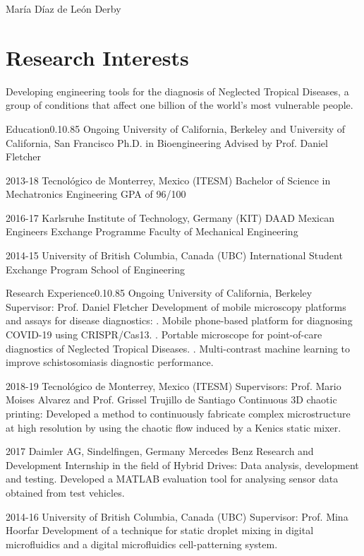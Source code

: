 \documentclass{federico_cv}
\begin{document}
\contact
{María Díaz de León Derby}
{} %
{} %



\section{Research Interests}
Developing engineering tools for the diagnosis of Neglected Tropical Diseases, a group of conditions that affect one billion of the world's most vulnerable people.


\begin{tblSection}{Education}{0.1}{0.85}
\degree
{Ongoing}
{University of California, Berkeley and University of California, San Francisco}
{Ph.D. in Bioengineering}
{Advised by Prof. Daniel Fletcher}

\degree
{2013-18}
{Tecnológico de Monterrey, Mexico (ITESM)}
{Bachelor of Science in Mechatronics Engineering}
{GPA of 96/100}

\degree
{2016-17}
{Karlsruhe Institute of Technology, Germany (KIT)}
{DAAD Mexican Engineers Exchange Programme}
{Faculty of Mechanical Engineering}

\degree
{2014-15}
{University of British Columbia, Canada (UBC)}
{International Student Exchange Program}
{School of Engineering}

\end{tblSection}


\begin{tblSection}{Research Experience}{0.1}{0.85}
\job
{Ongoing}
{University of California, Berkeley}
{Supervisor: Prof. Daniel Fletcher}
{Development of mobile microscopy platforms and assays for disease diagnostics:}
{. Mobile phone-based platform for diagnosing COVID-19 using CRISPR/Cas13.}
{. Portable microscope for point-of-care diagnostics of Neglected Tropical Diseases.}
{. Multi-contrast machine learning to improve schistosomiasis diagnostic performance.}

\job
{2018-19}
{Tecnológico de Monterrey, Mexico (ITESM)}
{Supervisors: Prof. Mario Moises Alvarez and Prof. Grissel Trujillo de Santiago}
{Continuous 3D chaotic printing: Developed a method to continuously fabricate complex microstructure at high resolution by using the chaotic flow induced by a Kenics static mixer.}

\job
{2017}
{Daimler AG, Sindelfingen, Germany}
{Mercedes Benz Research and Development}
{Internship in the field of Hybrid Drives: Data analysis, development and testing. Developed a MATLAB evaluation tool for analysing sensor data obtained from test vehicles.}

\job
{2014-16}
{University of British Columbia, Canada (UBC)}
{Supervisor: Prof. Mina Hoorfar}
{Development of a technique for static droplet mixing in digital microfluidics and a digital microfluidics cell-patterning system.}

\end{tblSection}
\let\thefootnote\relax{}\nocite{*}
\printbibliography[keyword={Publications},title={Publications},resetnumbers=true]
\printbibliography[keyword={Patents},title={Patents},resetnumbers=true]
\end{document}
